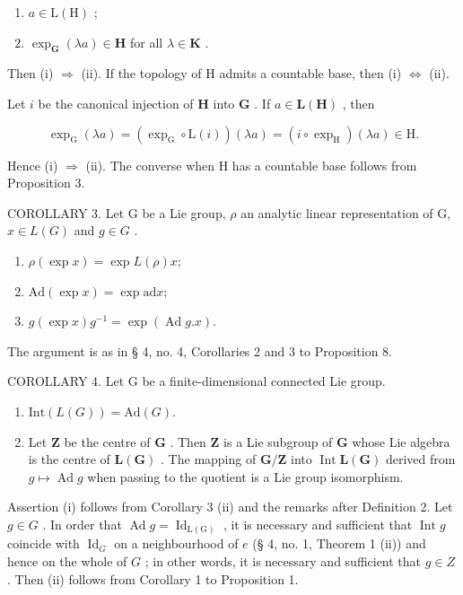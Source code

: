 \begin{enumerate}
\def\labelenumi{(\roman{enumi})}
\item
  \(a \in \mathrm{L}(\mathrm{H})\) ;
\item
  \(\exp_{\mathbf{G}}(\lambda a)\in \mathbf{H}\) for all \(\lambda \in \mathbf{K}\) .
\end{enumerate}

Then (i) \(\Rightarrow\) (ii). If the topology of H admits a countable base, then (i) \(\Leftrightarrow\) (ii).

Let \(i\) be the canonical injection of \(\mathbf{H}\) into \(\mathbf{G}\) . If \(a \in \mathbf{L}(\mathbf{H})\) , then

\[
\exp_ {\mathrm{G}} (\lambda a) = \left(\exp_ {\mathrm{G}} \circ \mathrm{L} (i)\right) (\lambda a) = (i \circ \exp_ {\mathrm{H}}) (\lambda a) \in \mathrm{H}.
\]

Hence (i) \(\Rightarrow\) (ii). The converse when H has a countable base follows from Proposition 3.

COROLLARY 3. Let G be a Lie group, \(\rho\) an analytic linear representation of G, \(x \in L(G)\) and \(g \in G\) .

\begin{enumerate}
\def\labelenumi{(\roman{enumi})}
\item
  \(\rho(\exp x) = \exp L(\rho)x;\)
\item
  \(\mathrm{Ad}(\exp x) = \exp \mathrm{ad} x;\)
\item
  \(g(\exp x)g^{-1} = \exp(\operatorname{Ad} g.x).\)
\end{enumerate}

The argument is as in § 4, no. 4, Corollaries 2 and 3 to Proposition 8.

COROLLARY 4. Let G be a finite-dimensional connected Lie group.

\begin{enumerate}
\def\labelenumi{(\roman{enumi})}
\item
  \(\text{Int}(L(G)) = \text{Ad}(G).\)
\item
  Let \(\mathbf{Z}\) be the centre of \(\mathbf{G}\) . Then \(\mathbf{Z}\) is a Lie subgroup of \(\mathbf{G}\) whose Lie algebra is the centre of \(\mathbf{L}(\mathbf{G})\) . The mapping of \(\mathbf{G} / \mathbf{Z}\) into \(\operatorname{Int} \mathbf{L}(\mathbf{G})\) derived from \(g \mapsto \operatorname{Ad} g\) when passing to the quotient is a Lie group isomorphism.
\end{enumerate}

Assertion (i) follows from Corollary 3 (ii) and the remarks after Definition 2. Let \(g \in G\) . In order that \(\operatorname{Ad} g = \operatorname{Id}_{\operatorname{L(G)}}\) , it is necessary and sufficient that \(\operatorname{Int} g\) coincide with \(\operatorname{Id}_G\) on a neighbourhood of \(e\) (§ 4, no. 1, Theorem 1 (ii)) and hence on the whole of \(G\) ; in other words, it is necessary and sufficient that \(g \in Z\) . Then (ii) follows from Corollary 1 to Proposition 1.

